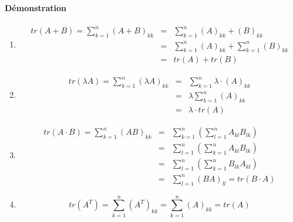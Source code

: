 \paragraph{Démonstration}
\begin{enumerate}[1)]
  \item 
    \begin{eqnarray*}
      tr(A + B) = \sum_{k=1}^{n}(A + B)_{kk} &=& \sum_{k=1}^{n}(A)_{kk} + (B)_{kk} \\
        &=& \sum_{k=1}^{n}(A)_{kk} + \sum_{k=1}^{n}(B)_{kk} \\
        &=& tr(A) + tr(B)
    \end{eqnarray*}
    
  \item
    \begin{eqnarray*}
      tr(\lambda A) = \sum_{k=1}^{n}(\lambda A)_{kk} &=& \sum_{k=1}^{n} \lambda \cdot (A)_{kk} \\
        &=& \lambda \sum_{k=1}^{n}(A)_{kk} \\
        &=& \lambda \cdot tr(A)
    \end{eqnarray*}
  
  \item 
    \begin{eqnarray*}
      tr(A \cdot B) = \sum_{k=1}^{n} (A B)_{kk} &=& \sum_{k=1}^{n} \left( \sum_{l=1}^{n} A_{kl} B_{lk} \right) \\
        &=& \sum_{l=1}^{n} \left( \sum_{k=1}^{n} A_{kl} B_{lk} \right) \\
        &=& \sum_{l=1}^{n} \left( \sum_{k=1}^{n} B_{lk} A_{kl} \right) \\
        &=& \sum_{l=1}^{n} (B A)_{ll} = tr(B \cdot A)
    \end{eqnarray*}
    
  \item
    $$tr(A^{T}) = \sum_{k=1}^{n} (A^{T})_{kk} = \sum_{k=1}^{n} (A)_{kk} = tr(A)$$
\end{enumerate}
